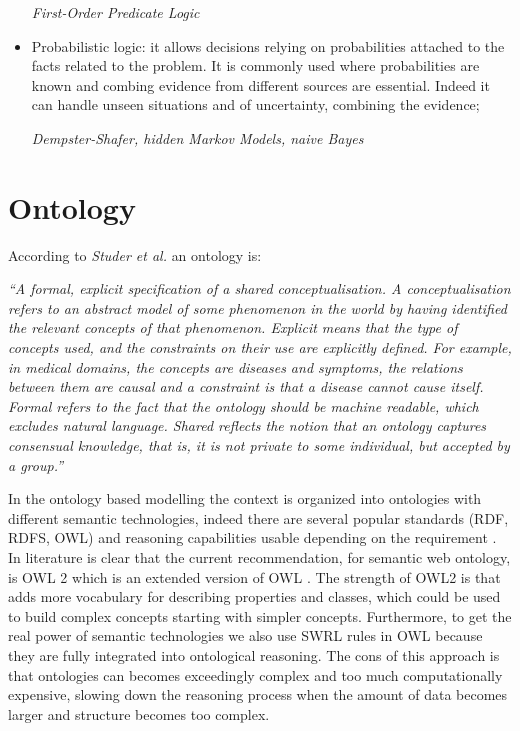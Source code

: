 \documentclass{thesisreport}
\begin{document}
\begin{itemize}
     \textit{First-Order Predicate Logic}
     
     \item Probabilistic logic: it allows decisions relying on probabilities attached to the facts related to the problem. It is commonly used where probabilities are known and combing evidence from different sources are essential. Indeed it can handle unseen situations and of uncertainty, combining the evidence; 
     
     \textit{Dempster-Shafer, hidden Markov Models, naive Bayes}
 \end{itemize}


\section{Ontology} \label{ontology}

According to \textit{Studer et al.} \cite{studer1998knowledge} an ontology is: 
\begin{center}
\textit{``A formal, explicit specification of a shared conceptualisation. A conceptualisation refers to an abstract model of some phenomenon in the world by having identified the relevant concepts of that phenomenon. Explicit means that the type of concepts used, and the constraints on their use are explicitly defined. For example, in medical domains, the concepts are diseases and symptoms, the relations between them are causal and a constraint is that a disease cannot cause itself. Formal refers to the fact that the ontology should be machine readable, which excludes natural language. Shared reflects the notion that an ontology captures consensual knowledge, that is, it is not private to some individual, but accepted by a group.”}
\end{center}


In the ontology based modelling the context is organized into ontologies with different semantic technologies, indeed there are several popular standards (RDF, RDFS, OWL) and reasoning capabilities usable depending on the requirement \cite{perera2014context}. 
In literature is clear that the current recommendation, for semantic web ontology, is OWL 2 which is an extended version of OWL \cite{perera2014context}. The strength of OWL2 is that adds more vocabulary for describing properties and classes, which could be used to build complex concepts starting with simpler concepts.
Furthermore, to get the real power of semantic technologies we also use SWRL rules in OWL because they are fully integrated into ontological reasoning. The cons of this approach is that ontologies can becomes exceedingly complex and too much computationally expensive, slowing down the reasoning process when the amount of data becomes larger and structure becomes too complex.
\end{document}
